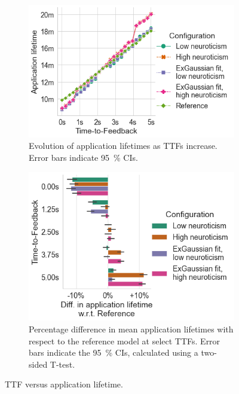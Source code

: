 \begin{figure}
    \centering
    \begin{subfigure}[]{\columnwidth}
        \centering
        \includegraphics[width=.9\textwidth]{figs/new_model/lifetime_all_ttfs.png}
        \caption{%
            Evolution of application lifetimes as \acp{TTF} increase.
            Error bars indicate \SI{95}{\percent} \acp{CI}.
        }
    \end{subfigure}
    \begin{subfigure}[]{\columnwidth}
        \centering
        \includegraphics[width=.9\textwidth]{figs/new_model/lifetime_diff.png}
        \caption{%
            Percentage difference in mean application lifetimes with respect to the reference model at select \acp{TTF}.
            Error bars indicate the \SI{95}{\percent} \acp{CI}, calculated using a two-sided T-test.
        }
    \end{subfigure}
    \caption{\acl{TTF} versus application lifetime.}\label{fig:lifetimes}
\end{figure}

